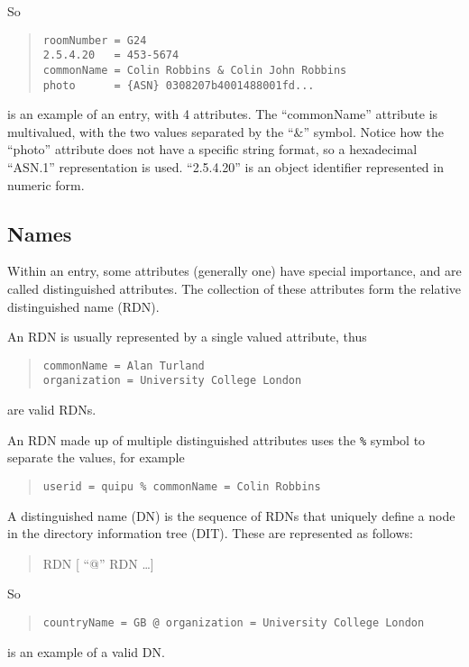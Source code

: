 So
\begin{quote}\begin{verbatim}	
roomNumber = G24
2.5.4.20   = 453-5674
commonName = Colin Robbins & Colin John Robbins
photo      = {ASN} 0308207b4001488001fd...
\end{verbatim}\end{quote}
is an example of an entry, with 4 attributes. The ``commonName'' attribute
is multivalued, 
with the two values separated by the ``\&'' symbol.
Notice how the ``photo'' attribute does not have a specific string format,
so a hexadecimal ``ASN.1'' representation is used.
``2.5.4.20'' is an object identifier represented in numeric form.


\subsection {Names}
\label{quipu_name}
Within an entry, some attributes (generally one) have special importance,
and are called  distinguished attributes.  The collection of these
attributes form the relative distinguished name
(RDN).

An RDN is usually represented by a single valued attribute, thus
\begin{quote}	\begin{verbatim}
commonName = Alan Turland
organization = University College London
\end{verbatim}\end{quote}
are valid RDNs. 

An RDN made up of multiple distinguished attributes uses the \verb+%+ symbol
to separate the values, for
example
\begin{quote}	\begin{verbatim}
userid = quipu % commonName = Colin Robbins
\end{verbatim}\end{quote}

A distinguished name (DN) is the sequence of RDNs that uniquely define
a node in the directory information tree (DIT).
These are represented as follows:
\begin{quote}
RDN [ ``@'' RDN \ldots]
\end{quote}
So
\begin{quote}\small\begin{verbatim}
countryName = GB @ organization = University College London 
\end{verbatim}\end{quote}
is an example of a valid DN.

